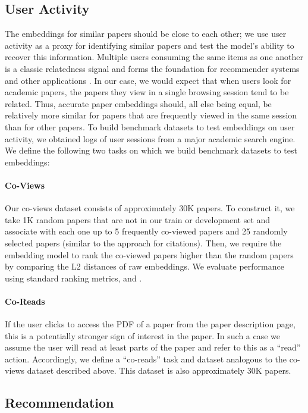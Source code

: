 \subsection{User Activity}
The embeddings for similar papers should be close to each other; 
we use user activity as a proxy for identifying similar papers and test the model's ability to recover this information. 
Multiple users consuming the same items as one another is a classic relatedness signal and forms the foundation for recommender systems and other applications \cite{schafer2007collaborative}. In our case, we would expect that when users look for academic papers, the papers they view in a single browsing session tend to be related.  Thus, accurate paper embeddings should, all else being equal, be relatively more similar for papers that are frequently viewed in the same session than for other papers.  
To build benchmark datasets to test embeddings on user activity, we obtained logs of user sessions from a major academic search engine. We define the following two tasks on which we build benchmark datasets to test embeddings:

\paragraph{Co-Views}
Our co-views dataset consists of approximately 30K papers.  To construct it, we take 1K random papers that are not in our train or development set and associate with each one up to 5 frequently co-viewed papers and 25 randomly selected papers (similar to the approach for citations). Then, we require the embedding model to rank the co-viewed papers higher than the random papers by comparing the L2 distances of raw embeddings.  We evaluate performance using standard ranking metrics, \ndcg and \map.

\paragraph{Co-Reads}
If the user clicks to access the PDF of a paper from the paper description page, this is a potentially stronger sign of interest in the paper.  In such a case we assume the user will read at least parts of the paper and refer to this as a ``read'' action.  Accordingly, we define a ``co-reads'' task and dataset analogous to the co-views dataset described above. This dataset is also approximately 30K papers.



\subsection{Recommendation}


